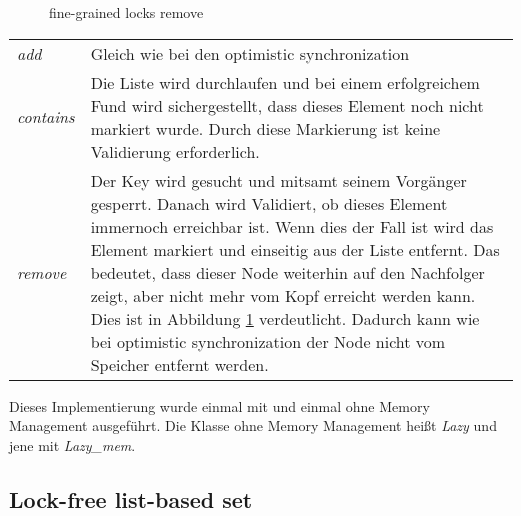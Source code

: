 \begin{figure}[H]
	\centering
	\caption{fine-grained locks remove}
	\label{tik:fine-grained-remove}
\end{figure}

\begin{table}[H]
    \begin{tabularx}{\textwidth}{lX}
        \textit{add} & Gleich wie bei den optimistic synchronization\\
		\textit{contains} & Die Liste wird durchlaufen und bei einem erfolgreichem Fund wird sichergestellt, dass dieses Element noch nicht markiert wurde.
		Durch diese Markierung ist keine Validierung erforderlich. \\
		\textit{remove} & Der Key wird gesucht und mitsamt seinem Vorgänger gesperrt. Danach wird Validiert, ob dieses Element immernoch erreichbar ist. 
		Wenn dies der Fall ist wird das Element markiert und einseitig aus der Liste entfernt. Das bedeutet, dass dieser Node weiterhin auf den Nachfolger 
		zeigt, aber nicht mehr vom Kopf erreicht werden kann. Dies ist in Abbildung \ref{tik:fine-grained-remove} verdeutlicht. Dadurch kann wie bei
		optimistic synchronization der Node nicht vom Speicher entfernt werden.\\
    \end{tabularx}
\end{table}

Dieses Implementierung wurde einmal mit und einmal ohne Memory Management ausgeführt. Die Klasse ohne Memory Management heißt \textit{Lazy} und jene mit \textit{Lazy\_mem}.

\subsection{Lock-free list-based set}

